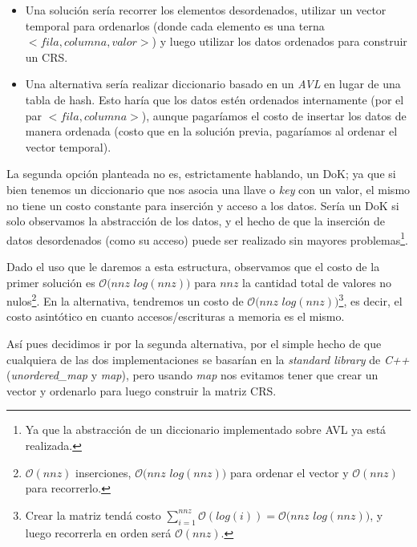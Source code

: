 \begin{itemize}
    \item Una soluci\'on ser\'ia recorrer los elementos desordenados, utilizar
        un vector temporal para ordenarlos (donde cada elemento es una terna
        $<fila,columna,valor>$) y luego utilizar los datos ordenados para
        construir un CRS.

    \item Una alternativa ser\'ia realizar diccionario basado en un
        \emph{AVL}\cite{wiki_avl} en lugar de una tabla de hash. Esto har\'ia que
        los datos est\'en ordenados internamente (por el par $<fila,columna>$),
        aunque pagar\'iamos el costo de insertar los datos de manera ordenada
        (costo que en la soluci\'on previa, pagar\'iamos al ordenar el vector
        temporal).
\end{itemize}
\smallskip

\par La segunda opci\'on planteada no es, estrictamente hablando, un DoK; ya que
si bien tenemos un diccionario que nos asocia una llave o \emph{key} con un
valor, el mismo no tiene un costo constante para inserci\'on y acceso a los
datos. Ser\'ia un DoK si solo observamos la abstracci\'on de los datos, y el
hecho de que la inserci\'on de datos desordenados (como su acceso) puede ser
realizado sin mayores problemas\footnote{Ya que la abstracci\'on de un
diccionario implementado sobre AVL ya est\'a realizada\cite{stl_map}.}.

\par Dado el uso que le daremos a esta estructura, observamos que el costo de la
primer soluci\'on es $\mathcal{O}(nnz$ $log(nnz))$ para $nnz$ la cantidad total de
valores no nulos\footnote{$\mathcal{O}(nnz)$ inserciones, $\mathcal{O}(nnz$
$log(nnz))$ para ordenar el vector y $\mathcal{O}(nnz)$ para recorrerlo.}. En la
alternativa, tendremos un costo de $\mathcal{O}(nnz$ $log(nnz))$\footnote{Crear la
matriz tend\'a costo $\sum_{i=1}^{nnz} \mathcal{O}(log(i)) = \mathcal{O}(nnz$
$log(nnz))$, y luego recorrerla en orden ser\'a $\mathcal{O}(nnz)$.}, es decir,
el costo asint\'otico en cuanto accesos/escrituras a memoria es el mismo.

\par As\'i pues decidimos ir por la segunda alternativa, por el simple hecho de
que cualquiera de las dos implementaciones se basar\'ian en la \emph{standard
library} de \emph{C++} (\emph{unordered\_map}\cite{stl_unordered_map} y
\emph{map}\cite{stl_map}), pero usando \emph{map} nos evitamos tener que crear
un vector y ordenarlo para luego construir la matriz CRS.

